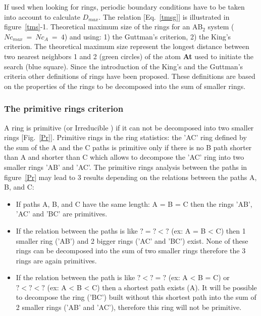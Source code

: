 If used when looking for rings, periodic boundary conditions have to be taken into account to calculate $D_{max}$. 
The relation [Eq.~\ref{tmsg}] is illustrated in figure~\ref{tms}-1.
{Theoretical maximum size of the rings for an AB$_2$ system ($Nc_{max}~=~Nc_{A}~=~4$) and using: 1) the Guttman's criterion, 2) the King's criterion. 
The theoretical maximum size represent the longest distance between two nearest neighbors 1 and 2 (green circles) of the atom {\bf At} used to initiate the search (blue square).}
\laf Since the introduction of the King's and the Guttman's criteria other definitions of rings have been proposed.  
These definitions are based on the properties of the rings to be decomposed into the sum of smaller rings. 

\subsubsection{The primitive rings criterion}

A ring is primitive \cite{Goetzke-127.215, YuanCormack-24-343} (or Irreducible \cite{Wooten-bk0109}) if it can not be decomposed into two smaller rings [Fig.~\ref{Pr}].
{Primitive rings in the ring statistics: the 'AC' ring defined by the sum of the A and the C paths 
is primitive only if there is no B path shorter than A and shorter than C which allows to decompose the 'AC' ring into two smaller rings 'AB' and 'AC'.}
\laf The primitive rings analysis between the paths in figure~\ref{Pr} may lead to 3 results depending on the relations between the paths A, B, and C:
\begin{itemize}
\item If paths A, B, and C have the same length: A = B = C then the rings 'AB', 'AC' and 'BC' are primitives. 
\item If the relation between the paths is like $?=?<?$ (ex: A = B < C) then 1 smaller ring ('AB') and 2 bigger rings ('AC' and 'BC') exist. 
None of these rings can be decomposed into the sum of two smaller rings therefore the 3 rings are again primitives. 
\item If the relation between the path is like $?<?=?$ (ex: A < B = C) or $?<?<?$ (ex: A < B < C) then a shortest path exists (A). 
It will be possible to decompose the ring ('BC') built without this shortest path into the sum of 2 smaller rings ('AB' and 'AC'), therefore this ring will not be primitive. 
\end{itemize}

